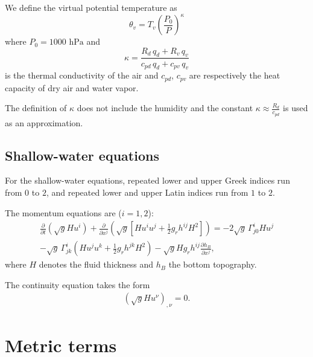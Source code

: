\documentclass{article}
\begin{document}
We define the virtual potential temperature as
\begin{equation}\label{eq:pot_temp}
\theta_v = T_v  \left( \frac{P_0}{P} \right)^\kappa
\end{equation}
where $P_0 = 1000 \text{ hPa}$ and
\begin{equation}
   \kappa = \frac{R_d \, q_d + R_v \, q_v}{c_{pd} \, q_d + c_{pv} \, q_{v}}
\end{equation}
is the thermal conductivity of the air and $c_{pd}$, $c_{pv}$ are respectively the heat capacity of dry air and water vapor.

The definition of $\kappa$ does not include the humidity and the constant $\kappa \approx \frac{R_d}{c_{pd}}$ is used as an approximation.

\subsection{Shallow-water equations}
For the shallow-water equations, repeated lower and upper Greek indices run from $0$ to $2$, and repeated lower and upper Latin indices run from $1$ to $2$.

The momentum equations are ($i=1,2$):
\begin{align}
\frac{\partial}{\partial t} \left( \sqrt{g}Hu^i \right)+\frac{\partial}{\partial x^j} \left( \sqrt{g}\left[Hu^i u^j +\frac{1}{2}g_rh^{ij}H^2\right]\right) =- 2\sqrt{g}\,\Gamma^i_{j0}Hu^j \nonumber \\
-\sqrt{g}\,\Gamma^i_{jk} \left( Hu^ju^k +\frac{1}{2}g_rh^{jk}H^2  \right) -\sqrt{g}Hg_rh^{ij}\frac{\partial h_B}{\partial x^j},
\end{align}
where $H$ denotes the fluid thickness and $h_B$ the bottom topography.

The continuity equation takes the form
\begin{align}
\left( \sqrt{g} H u^\nu \right)_{,\nu} = 0.
\end{align}

\section{Metric terms}
\end{document}
